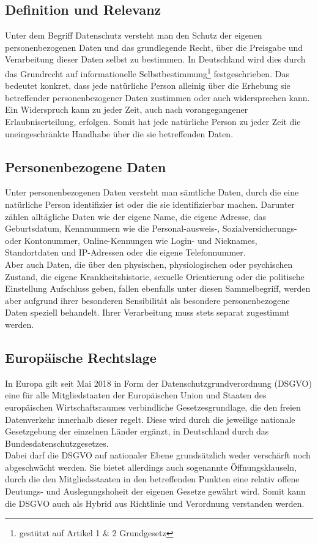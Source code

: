 \subsection{Definition und Relevanz}
    Unter dem Begriff Datenschutz versteht man den Schutz der eigenen personenbezogenen Daten und das grundlegende Recht, über die Preisgabe und Verarbeitung dieser Daten selbst zu bestimmen. In Deutschland wird dies durch das Grundrecht auf informationelle Selbstbestimmung\footnote{gestützt auf Artikel 1 \& 2 Grundgesetz} festgeschrieben. Das bedeutet konkret, dass jede natürliche Person alleinig über die Erhebung sie betreffender personenbezogener Daten zustimmen oder auch widersprechen kann. Ein Widerspruch kann zu jeder Zeit, auch nach vorangegangener Erlaubniserteilung, erfolgen. Somit hat jede natürliche Person zu jeder Zeit die uneingeschränkte Handhabe über die sie betreffenden Daten.

\subsection{Personenbezogene Daten}
    Unter personenbezogenen Daten versteht man sämtliche Daten, durch die eine natürliche Person identifizier ist oder die sie identifizierbar machen. Darunter zählen alltägliche Daten wie der eigene Name, die eigene Adresse, das Geburtsdatum, Kennnummern wie die Personal-ausweis-, Sozialversicherungs- oder Kontonummer, Online-Kennungen wie Login- und Nicknames, Standortdaten und IP-Adressen oder die eigene Telefonnummer.\\
    Aber auch Daten, die über den physischen, physiologischen oder psychischen Zustand, die eigene Krankheitshistorie, sexuelle Orientierung oder die politische Einstellung Aufschluss geben, fallen ebenfalls unter diesen Sammelbegriff, werden aber aufgrund ihrer besonderen Sensibilität als \glqq besondere personenbezogene Daten\grqq{} speziell behandelt. Ihrer Verarbeitung muss stets separat zugestimmt werden.

\subsection{Europäische Rechtslage}
    In Europa gilt seit Mai 2018 in Form der \glqq Datenschutzgrundverordnung\grqq{} (DSGVO) eine für alle Mitgliedstaaten der Europäischen Union und Staaten des europäischen Wirtschaftsraumes verbindliche Gesetzesgrundlage, die den freien Datenverkehr innerhalb dieser regelt. Diese wird durch die jeweilige nationale Gesetzgebung der einzelnen Länder ergänzt, in Deutschland durch das Bundesdatenschutzgesetzes.\\
    Dabei darf die DSGVO auf nationaler Ebene grundsätzlich weder verschärft noch abgeschwächt werden. Sie bietet allerdings auch sogenannte Öffnungsklauseln, durch die den Mitgliedsstaaten in den betreffenden Punkten eine relativ offene Deutungs- und Auslegungshoheit der eigenen Gesetze gewährt wird. Somit kann die DSGVO auch als Hybrid aus Richtlinie und Verordnung verstanden werden.\\

